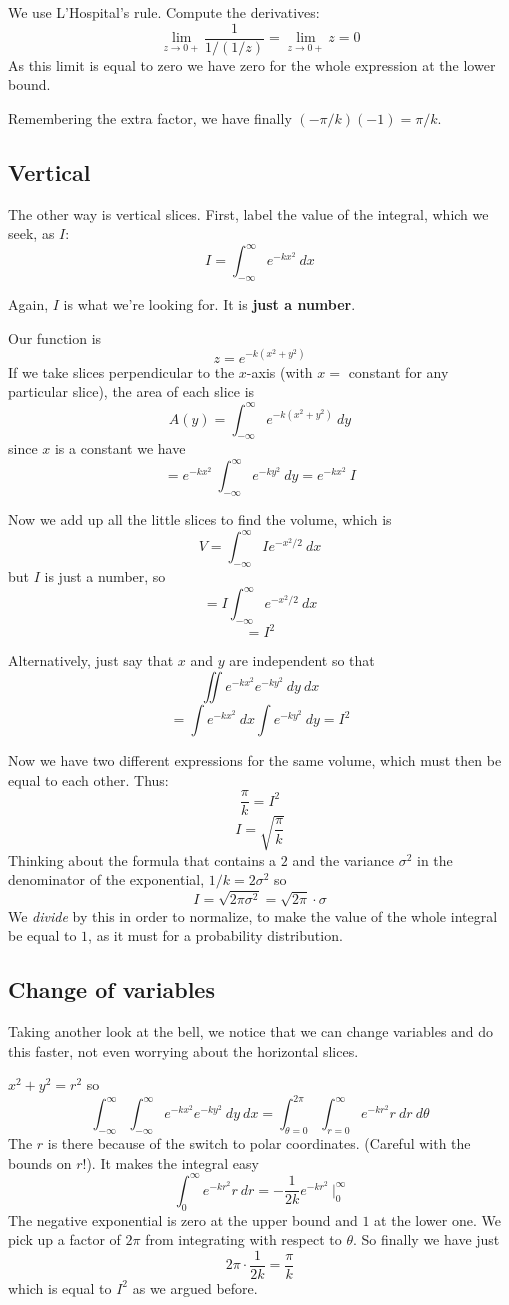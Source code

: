 \documentclass[11pt, oneside]{article}
\begin{document}
We use L'Hospital's rule.  Compute the derivatives:
\[ \lim_{z \rightarrow 0+} \frac{1}{1/(1/z)} = \lim_{z \rightarrow 0+} z = 0 \]
As this limit is equal to zero we have zero for the whole expression at the lower bound.

Remembering the extra factor, we have finally $(-\pi/k)(-1) = \pi/k$.

\subsection*{Vertical}
The other way is vertical slices.  First, label the value of the integral, which we seek, as $I$:
\[ I = \int_{-\infty}^{\infty} e^{-kx^2} \ dx \]

Again, $I$ is what we're looking for.  It is \textbf{just a number}.  

Our function is
\[ z = e^{-k(x^2 + y^2)} \]
If we take slices perpendicular to the $x$-axis (with $x =$ constant for any particular slice), the area of each slice is
\[ A(y) = \int_{-\infty}^{\infty} e^{-k(x^2 + y^2)} \ dy \]
since  $x$ is a constant we have
\[ = e^{-kx^2} \ \int_{-\infty}^{\infty} e^{-ky^2} \ dy = e^{-kx^2} \ I \]

Now we add up all the little slices to find the volume, which is
\[  V =  \int_{-\infty}^{\infty} I e^{-x^2/2} \ dx \]
but $I$ is just a number, so
\[  =  I \int_{-\infty}^{\infty} e^{-x^2/2} \ dx \]
\[ = I^2 \]

Alternatively, just say that $x$ and $y$ are independent so that
\[ \iint e^{-kx^2} e^{-ky^2} \ dy \ dx \]
\[ = \int e^{-kx^2} \ dx \int e^{-ky^2} \ dy = I^2 \]

Now we have two different expressions for the same volume, which must then be equal to each other.  Thus:
\[ \frac{\pi}{k} = I^2 \]
\[ I = \sqrt{\frac{\pi}{k}} \]
Thinking about the formula that contains a $2$ and the variance $\sigma^2$ in the denominator of the exponential, $1/k = 2 \sigma^2$ so
\[ I = \sqrt{2 \pi \sigma^2 }   = \sqrt{2 \pi } \cdot \sigma \]
We \emph{divide} by this in order to normalize, to make the value of the whole integral be equal to $1$, as it must for a probability distribution.

\subsection*{Change of variables}
Taking another look at the bell, we notice that we can change variables and do this faster, not even worrying about the horizontal slices.

$x^2 + y^2 = r^2$ so
\[ \int_{-\infty}^{\infty} \int_{-\infty}^{\infty} e^{-kx^2} e^{-ky^2} \ dy \ dx = \int_{\theta = 0}^{2 \pi} \int_{r=0}^{\infty} e^{-kr^2} r \ dr \ d \theta \]
The $r$ is there because of the switch to polar coordinates.  (Careful with the bounds on $r$!).  It makes the integral easy
\[  \int_{0}^{\infty} e^{-kr^2} r \ dr  = -\frac{1}{2k} e^{-kr^2} \ \bigg |_0^{\infty} \]
The negative exponential is zero at the upper bound and $1$ at the lower one.  We pick up a factor of $2 \pi$ from integrating with respect to $\theta$.  So finally we have just
\[ 2 \pi \cdot \frac{1}{2k} = \frac{\pi}{k} \]
which is equal to $I^2$ as we argued before.
\end{document}
